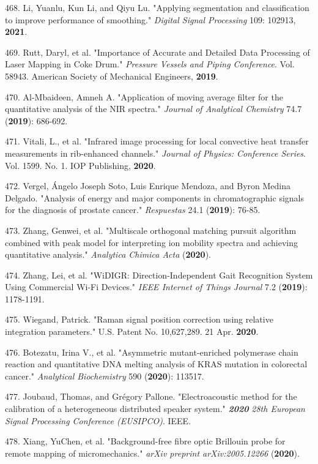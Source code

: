 468. Li, Yuanlu, Kun Li, and Qiyu Lu. "Applying segmentation and classification to improve performance of smoothing." \textit{Digital Signal Processing} 109: 102913, \textbf{2021}.

469. Rutt, Daryl, et al. "Importance of Accurate and Detailed Data Processing of Laser Mapping in Coke Drum." \textit{Pressure Vessels and Piping Conference}. Vol. 58943. American Society of Mechanical Engineers, \textbf{2019}.

470. Al-Mbaideen, Amneh A. "Application of moving average filter for the quantitative analysis of the NIR spectra." \textit{Journal of Analytical Chemistry} 74.7 (\textbf{2019}): 686-692.

471. Vitali, L., et al. "Infrared image processing for local convective heat transfer measurements in rib-enhanced channels." \textit{Journal of Physics: Conference Series}. Vol. 1599. No. 1. IOP Publishing, \textbf{2020}.

472. Vergel, \'{A}ngelo Joseph Soto, Luis Enrique Mendoza, and Byron Medina Delgado. "Analysis of energy and major components in chromatographic signals for the diagnosis of prostate cancer." \textit{Respuestas} 24.1 (\textbf{2019}): 76-85.

473. Zhang, Genwei, et al. "Multiscale orthogonal matching pursuit algorithm combined with peak model for interpreting ion mobility spectra and achieving quantitative analysis." \textit{Analytica Chimica Acta} (\textbf{2020}).

474. Zhang, Lei, et al. "WiDIGR: Direction-Independent Gait Recognition System Using Commercial Wi-Fi Devices." \textit{IEEE Internet of Things Journal} 7.2 (\textbf{2019}): 1178-1191.

475. Wiegand, Patrick. "Raman signal position correction using relative integration parameters." U.S. Patent No. 10,627,289. 21 Apr. \textbf{2020}.

476. Botezatu, Irina V., et al. "Asymmetric mutant-enriched polymerase chain reaction and quantitative DNA melting analysis of KRAS mutation in colorectal cancer." \textit{Analytical Biochemistry} 590 (\textbf{2020}): 113517.

477. Joubaud, Thomas, and Gr\'{e}gory Pallone. "Electroacoustic method for the calibration of a heterogeneous distributed speaker system." \textbf{\textit{2020}} \textit{28th European Signal Processing Conference (EUSIPCO)}. IEEE.

478. Xiang, YuChen, et al. "Background-free fibre optic Brillouin probe for remote mapping of micromechanics." \textit{arXiv preprint arXiv:2005.12266} (\textbf{2020}).

